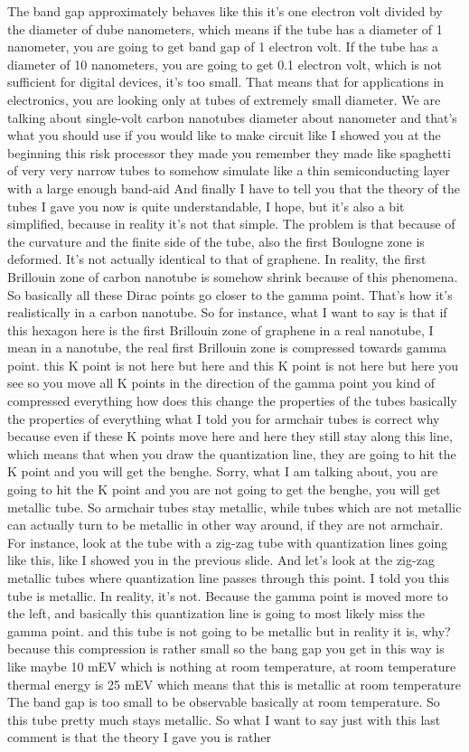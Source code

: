 The band gap approximately behaves like this it's one electron volt divided by the diameter of dube nanometers, which means if the tube has a diameter of 1 nanometer, you are going to get band gap of 1 electron volt. If the tube has a diameter of 10 nanometers, you are going to get 0.1 electron volt, which is not sufficient for digital devices, it's too small. That means that for applications in electronics, you are looking only at tubes of extremely small diameter. We are talking about single-volt carbon nanotubes diameter about nanometer and that's what you should use if you would like to make circuit like I showed you at the beginning this risk processor they made you remember they made like spaghetti of very very narrow tubes to somehow simulate like a thin semiconducting layer with a large enough band-aid And finally I have to tell you that the theory of the tubes I gave you now is quite understandable, I hope, but it's also a bit simplified, because in reality it's not that simple. The problem is that because of the curvature and the finite side of the tube, also the first Boulogne zone is deformed. It's not actually identical to that of graphene. In reality, the first Brillouin zone of carbon nanotube is somehow shrink because of this phenomena. So basically all these Dirac points go closer to the gamma point. That's how it's realistically in a carbon nanotube. So for instance, what I want to say is that if this hexagon here is the first Brillouin zone of graphene in a real nanotube, I mean in a nanotube, the real first Brillouin zone is compressed towards gamma point. this K point is not here but here and this K point is not here but here you see so you move all K points in the direction of the gamma point you kind of compressed everything how does this change the properties of the tubes basically the properties of everything what I told you for armchair tubes is correct why because even if these K points move here and here they still stay along this line, which means that when you draw the quantization line, they are going to hit the K point and you will get the benghe. Sorry, what I am talking about, you are going to hit the K point and you are not going to get the benghe, you will get metallic tube. So armchair tubes stay metallic, while tubes which are not metallic can actually turn to be metallic in other way around, if they are not armchair. For instance, look at the tube with a zig-zag tube with quantization lines going like this, like I showed you in the previous slide. And let's look at the zig-zag metallic tubes where quantization line passes through this point. I told you this tube is metallic. In reality, it's not. Because the gamma point is moved more to the left, and basically this quantization line is going to most likely miss the gamma point. and this tube is not going to be metallic but in reality it is, why? because this compression is rather small so the bang gap you get in this way is like maybe 10 mEV which is nothing at room temperature, at room temperature thermal energy is 25 mEV which means that this is metallic at room temperature The band gap is too small to be observable basically at room temperature. So this tube pretty much stays metallic. So what I want to say just with this last comment is that the theory I gave you is rather 